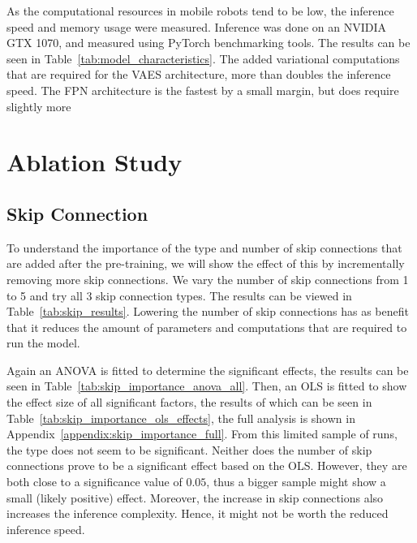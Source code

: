 As the computational resources in mobile robots tend to be low, the inference speed and memory usage were measured. Inference was done on an NVIDIA GTX 1070, and measured using PyTorch benchmarking tools. The results can be seen in Table~\ref{tab:model_characteristics}. The added variational computations that are required for the VAES architecture, more than doubles the inference speed. The FPN architecture is the fastest by a small margin, but does require slightly more 




\section{Ablation Study}

\subsection{Skip Connection}
To understand the importance of the type and number of skip connections that are added after the pre-training, we will show the effect of this by incrementally removing more skip connections. We vary the number of skip connections from 1 to 5 and try all 3 skip connection types. The results can be viewed in Table~\ref{tab:skip_results}. Lowering the number of skip connections has as benefit that it reduces the amount of parameters and computations that are required to run the model.


Again an ANOVA is fitted to determine the significant effects, the results can be seen in Table~\ref{tab:skip_importance_anova_all}. 
Then, an OLS is fitted to show the effect size of all significant factors, the results of which can be seen in Table~\ref{tab:skip_importance_ols_effects}, the full analysis is shown in Appendix~\ref{appendix:skip_importance_full}. From this limited sample of runs, the type does not seem to be significant. Neither does the number of skip connections prove to be a significant effect based on the OLS. However, they are both close to a significance value of $0.05$, thus a bigger sample might show a small (likely positive) effect. Moreover, the increase in skip connections also increases the inference complexity. Hence, it might not be worth the reduced inference speed.




